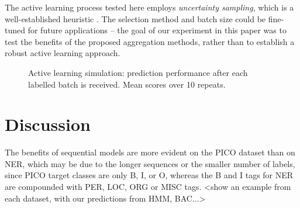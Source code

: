 The active learning process tested here employs \emph{uncertainty sampling}, which is a well-established heuristic \cite{active learning paper -- see tacl paper?}. The selection method and batch size could be fine-tuned for future applications -- the goal of our experiment in this paper was to test the benefits of the proposed aggregation methods,
rather than to establish a robust active learning approach.
 
\begin{figure}
\centering
{}
\caption{Active learning simulation: prediction performance after each labelled batch is received. Mean scores over 10 repeats.}
\label{fig:al}
\end{figure}

\section{Discussion}

The benefits of sequential models are more evident on the PICO dataset than on NER, which may be due to the longer sequences or the smaller number of labels, since PICO target classes are only B, I, or O, whereas the B and I tags for NER 
are compounded with PER, LOC, ORG or MISC tags. <show an example from each dataset, with our predictions from HMM, BAC...>
